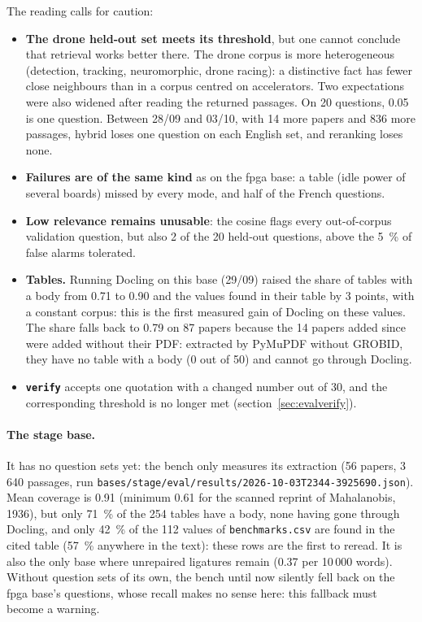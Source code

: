 \documentclass[11pt,a4paper]{article}
\newcommand{\cmd}[1]{\texttt{#1}}
\begin{document}
The reading calls for caution:
\begin{itemize}
  \item \textbf{The drone held-out set meets its threshold}, but one cannot conclude that
    retrieval works better there. The drone corpus is more heterogeneous (detection, tracking,
    neuromorphic, drone racing): a distinctive fact has fewer close neighbours than in a
    corpus centred on accelerators. Two expectations were also widened after reading the
    returned passages. On 20 questions, 0.05 is one question. Between 28/09 and 03/10, with
    14 more papers and 836 more passages, hybrid loses one question on each English set, and
    reranking loses none.
  \item \textbf{Failures are of the same kind} as on the fpga base: a table (idle power of
    several boards) missed by every mode, and half of the French questions.
  \item \textbf{Low relevance remains unusable}: the cosine flags every out-of-corpus
    validation question, but also 2 of the 20 held-out questions, above the 5~\% of false
    alarms tolerated.
  \item \textbf{Tables.} Running Docling on this base (29/09) raised the share of tables with a
    body from 0.71 to 0.90 and the values found in their table by 3 points, with a constant
    corpus: this is the first measured gain of Docling on these values. The share falls back
    to 0.79 on 87 papers because the 14 papers added since were added without their PDF:
    extracted by PyMuPDF without GROBID, they have no table with a body (0 out of 50) and
    cannot go through Docling.
  \item \textbf{\cmd{verify}} accepts one quotation with a changed number out of 30, and the
    corresponding threshold is no longer met (section~\ref{sec:evalverify}).
\end{itemize}

\paragraph{The stage base.} It has no question sets yet: the bench only measures its
extraction (56 papers, 3\,640 passages, run
\cmd{bases/stage/eval/results/2026-10-03T2344-3925690.json}). Mean coverage is 0.91 (minimum
0.61 for the scanned reprint of Mahalanobis, 1936), but only 71~\% of the 254 tables have a
body, none having gone through Docling, and only 42~\% of the 112 values of
\cmd{benchmarks.csv} are found in the cited table (57~\% anywhere in the text): these rows are
the first to reread. It is also the only base where unrepaired ligatures remain (0.37 per
10\,000 words). Without question sets of its own, the bench until now silently fell back on
the fpga base's questions, whose recall makes no sense here: this fallback must become a
warning.
\end{document}
